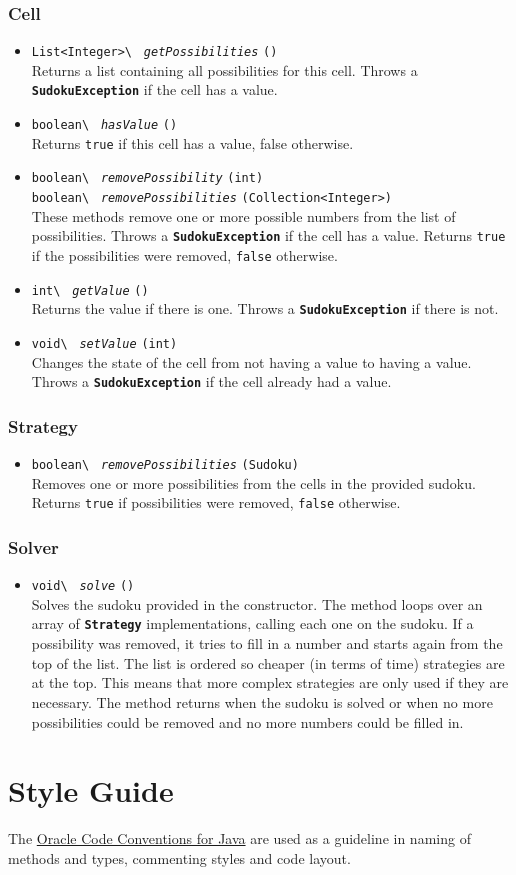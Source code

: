 \documentclass[11pt, a4paper, fleqn]{article}
\newcommand{\class}[1]{{\color{class}\textbf{\lstinline{#1}}}}
\newcommand{\method}[3]{%
\lstinline{#1\ }%
{\color{method}\textit{\lstinline{#2}}}%
\lstinline{(#3)}%
}
\newcommand{\java}[1]{\lstinline{#1}}
\begin{document}
\subsubsection{Cell}
\begin{itemize}
\item \method{List<Integer>}{getPossibilities}{}\\
Returns a list containing all possibilities for this cell. Throws a \class{SudokuException} if
the cell has a value.
\item \method{boolean}{hasValue}{}\\
Returns \java{true} if this cell has a value, false otherwise.
\item \method{boolean}{removePossibility}{int}\\
      \method{boolean}{removePossibilities}{Collection<Integer>}\\
These methods remove one or more possible numbers from the list of possibilities. Throws a
\class{SudokuException} if the cell has a value. Returns \java{true} if the possibilities were removed,
\java{false} otherwise.
\item \method{int}{getValue}{}\\
Returns the value if there is one. Throws a \class{SudokuException} if there is not.
\item \method{void}{setValue}{int}\\
Changes the state of the cell from not having a value to having a value. Throws a \class{SudokuException}
if the cell already had a value.
\end{itemize}
\subsubsection{Strategy}
\begin{itemize}
\item \method{boolean}{removePossibilities}{Sudoku}\\
Removes one or more possibilities from the cells in the provided sudoku. Returns \java{true} if
possibilities were removed, \java{false} otherwise.
\end{itemize}
\subsubsection{Solver}
\begin{itemize}
\item \method{void}{solve}{}\\
Solves the sudoku provided in the constructor. The method loops over an array of \class{Strategy}
implementations, calling each one on the sudoku. If a possibility was removed, it tries to fill
in a number and starts again from the top of the list. The list is ordered so cheaper (in terms of
time) strategies are at the top. This means that more complex strategies are only used if they are
necessary. The method returns when the sudoku is solved or when no more possibilities could be removed
and no more numbers could be filled in.
\end{itemize}

\section{Style Guide}
The \href{http://www.oracle.com/technetwork/java/javase/documentation/codeconvtoc-136057.html}{Oracle Code Conventions for Java}
are used as a guideline in naming of methods and types, commenting styles and code layout.
\end{document}
